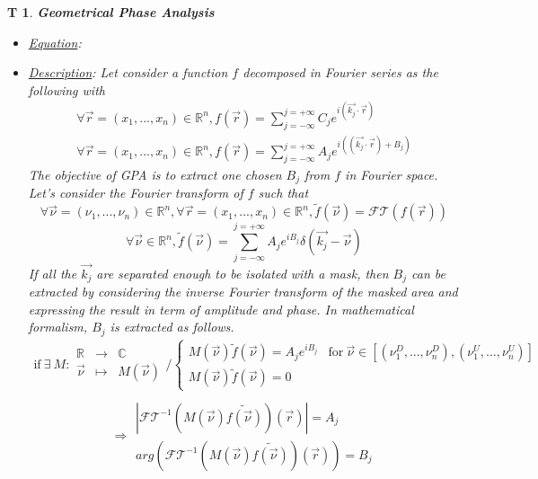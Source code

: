 \documentclass[12pt]{article}
\newtheorem{T}{T}
\begin{document}
\begin{T}
\normalfont \textbf{Geometrical Phase Analysis}
\begin{itemize}
\item \underline{Equation}: 
\item \underline{Description}: Let consider a function $f$ decomposed in Fourier series as the following with 
\begin{equation}
\begin{gathered}
\forall \vec{r}=(x_1,...,x_n) \in \mathbb{R}^n, f(\vec{r})=\sum_{j=-\infty}^{j=+\infty}C_je^{i(\vec{k_j}\cdot\vec{r})} \\
\forall \vec{r}=(x_1,...,x_n) \in \mathbb{R}^n, f(\vec{r})=\sum_{j=-\infty}^{j=+\infty}A_je^{i((\vec{k_j}\cdot\vec{r})+B_j)}
\end{gathered}
\end{equation}
The objective of GPA is to extract one chosen $B_j$ from $f$ in Fourier space. Let's consider the Fourier transform of $f$ such that
\begin{equation*}
\forall \vec{\nu}=(\nu_1,...,\nu_n) \in \mathbb{R}^n, \forall \vec{r}=(x_1,...,x_n) \in \mathbb{R}^n, \widetilde{f}(\vec{\nu})=\mathcal{FT}(f(\vec{r}))
\end{equation*}
\begin{equation}
\forall \vec{\nu}\in \mathbb{R}^n, \widetilde{f}(\vec{\nu})=\sum_{j=-\infty}^{j=+\infty}A_je^{iB_j}\delta(\vec{k_j}-\vec{\nu})
\end{equation}
If all the $\vec{k_j}$ are separated enough to be isolated with a mask, then $B_j$ can be extracted by considering the inverse Fourier transform of the masked area and expressing the result in term of amplitude and phase. In mathematical formalism, $B_j$ is extracted as follows.
\begin{equation*}
\begin{gathered}
\text{if} \ \exists \ M :
\begin{array}{|rcl}
\mathbb{R} & \longrightarrow & \mathbb{C} \\
\vec{\nu} & \longmapsto & M(\vec{\nu}) 
    \end{array} / \begin{cases}
    					M(\vec{\nu})\widetilde{f}(\vec{\nu})=A_je^{iB_j} & \text{for} \ \vec{\nu} \in [(\nu_1^D,...,\nu_n^D),(\nu_1^U,...,\nu_n^U)] \\
    					M(\vec{\nu})\widetilde{f}(\vec{\nu})=0 & 
    				 \end{cases} \\
\end{gathered}
\end{equation*}
\begin{equation}
\Rightarrow \begin{array}{l}
|\mathcal{FT}^{-1}(M(\vec{\nu})\widetilde{f(\vec{\nu})})(\vec{r})|=A_j \\
arg(\mathcal{FT}^{-1}(M(\vec{\nu})\widetilde{f(\vec{\nu})})(\vec{r}))=B_j
\end{array}
\label{eq:GPA_method}
\end{equation}


\end{itemize}
\end{T}
\end{document}
